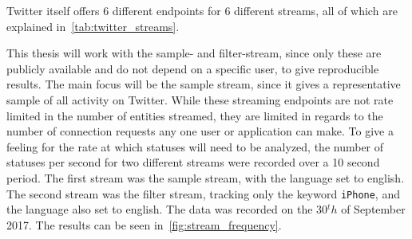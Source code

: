 Twitter itself offers 6 different endpoints for 6 different streams, all of which are explained in~\autoref{tab:twitter_streams}.

\begin{table}
    \caption{All streams offered by Twitter~\cite{twitterDocs}}
    \label{tab:twitter_streams}
\end{table}

This thesis will work with the sample- and filter-stream, since only these are publicly available and do not depend on a specific user,
to give reproducible results.
The main focus will be the sample stream, since it gives a representative sample of all activity on Twitter.
While these streaming endpoints are not rate limited in the number of entities streamed,
they are limited in regards to the number of connection requests any one user or application can make.
To give a feeling for the rate at which statuses will need to be analyzed,
the number of statuses per second for two different streams were recorded over a 10 second period.
The first stream was the sample stream, with the language set to english.
The second stream was the filter stream, tracking only the keyword \texttt{iPhone}, and the language also set to english.
The data was recorded on the 30$^th$ of September 2017.
The results can be seen in~\autoref{fig:stream_frequency}.

